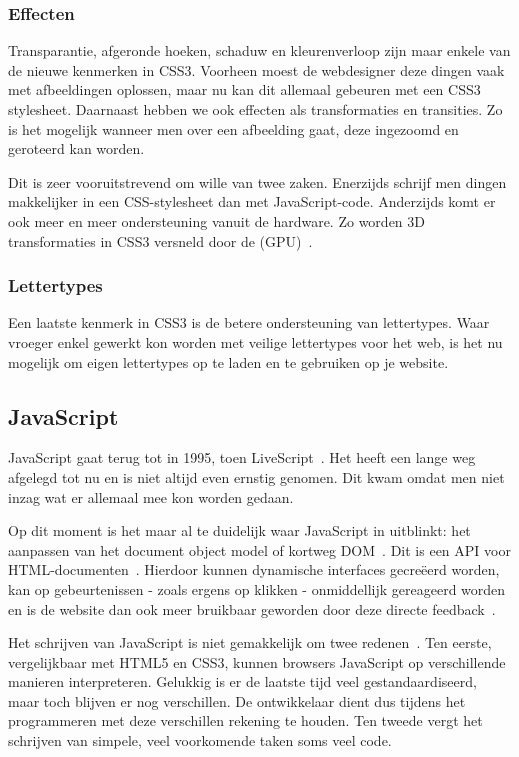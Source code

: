 \subsubsection{Effecten}
Transparantie, afgeronde hoeken, schaduw en kleurenverloop zijn maar enkele van de nieuwe kenmerken in CSS3. Voorheen moest de webdesigner deze dingen vaak met afbeeldingen oplossen, maar nu kan dit allemaal gebeuren met een CSS3 stylesheet. Daarnaast hebben we ook effecten als transformaties en transities. Zo is het mogelijk wanneer men over een afbeelding gaat, deze ingezoomd en geroteerd kan worden. 

Dit is zeer vooruitstrevend om wille van twee zaken. Enerzijds schrijf men dingen makkelijker in een CSS-stylesheet dan met JavaScript-code. Anderzijds komt er ook meer en meer ondersteuning vanuit de hardware. Zo worden 3D transformaties in CSS3 versneld door de  (GPU)~\cite{Hales2012,Kool2012}.

\subsubsection{Lettertypes}
Een laatste kenmerk in CSS3 is de betere ondersteuning van lettertypes. Waar vroeger enkel gewerkt kon worden met veilige lettertypes voor het web, is het nu mogelijk om eigen lettertypes op te laden en te gebruiken op je website.

\subsection{JavaScript}
\label{ref:javascript}
JavaScript gaat terug tot in 1995, toen LiveScript~\cite{McFarland2011}. Het heeft een lange weg afgelegd tot nu en is niet altijd even ernstig genomen. Dit kwam omdat men niet inzag wat er allemaal mee kon worden gedaan. 

Op dit moment is het maar al te duidelijk waar JavaScript in uitblinkt: het aanpassen van het document object model of kortweg DOM~\cite{PhilDutson2012}. Dit is een API voor HTML-documenten~\cite{Hegaret2004}. Hierdoor kunnen dynamische interfaces gecreëerd worden, kan op gebeurtenissen - zoals ergens op klikken - onmiddellijk gereageerd worden en is de website dan ook meer bruikbaar geworden door deze directe feedback~\cite{McFarland2011}.

Het schrijven van JavaScript is niet gemakkelijk om twee redenen~\cite{McFarland2011}. Ten eerste, vergelijkbaar met HTML5 en CSS3, kunnen browsers JavaScript op verschillende manieren interpreteren. Gelukkig is er de laatste tijd veel gestandaardiseerd, maar toch blijven er nog verschillen. De ontwikkelaar dient dus tijdens het programmeren met deze verschillen rekening te houden. Ten tweede vergt het schrijven van simpele, veel voorkomende taken soms veel code.

